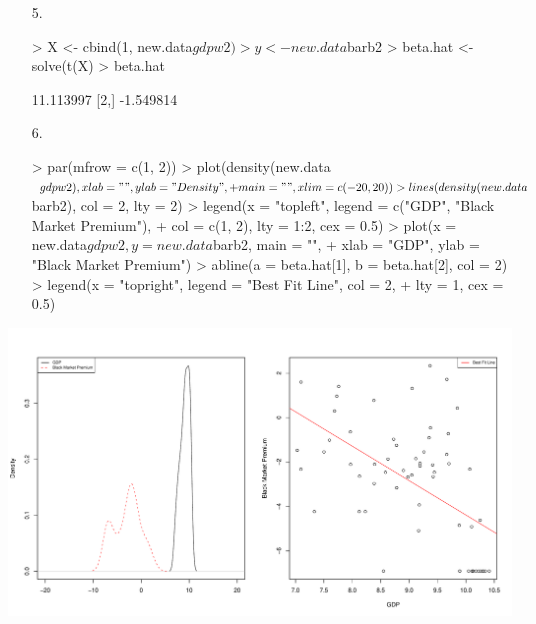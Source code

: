 \documentclass[handout]{beamer}
\newcommand{\red}{\color{red}}
\begin{document}
\begin{frame}[fragile]
\begin{enumerate}
\red
\footnotesize
\item[5.]
\begin{Schunk}
\begin{Sinput}
> X <- cbind(1, new.data$gdpw2)
> y <- new.data$barb2
> beta.hat <- solve(t(X) %
> beta.hat
\end{Sinput}
\begin{Soutput}
          [,1]
[1,] 11.113997
[2,] -1.549814
\end{Soutput}
\end{Schunk}
 
\item[6.]
\begin{Schunk}
\begin{Sinput}
> par(mfrow = c(1, 2))
> plot(density(new.data$gdpw2), xlab = "", ylab = "Density", 
+     main = "", xlim = c(-20, 20))
> lines(density(new.data$barb2), col = 2, lty = 2)
> legend(x = "topleft", legend = c("GDP", "Black Market Premium"), 
+     col = c(1, 2), lty = 1:2, cex = 0.5)
> plot(x = new.data$gdpw2, y = new.data$barb2, main = "", 
+     xlab = "GDP", ylab = "Black Market Premium")
> abline(a = beta.hat[1], b = beta.hat[2], col = 2)
> legend(x = "topright", legend = "Best Fit Line", col = 2, 
+     lty = 1, cex = 0.5)
\end{Sinput}
\end{Schunk}
\end{enumerate}
\end{frame}

\begin{frame}
 
\begin{center}
\includegraphics{rslides-plot6}
\end{center}
\end{frame}
\end{document}
